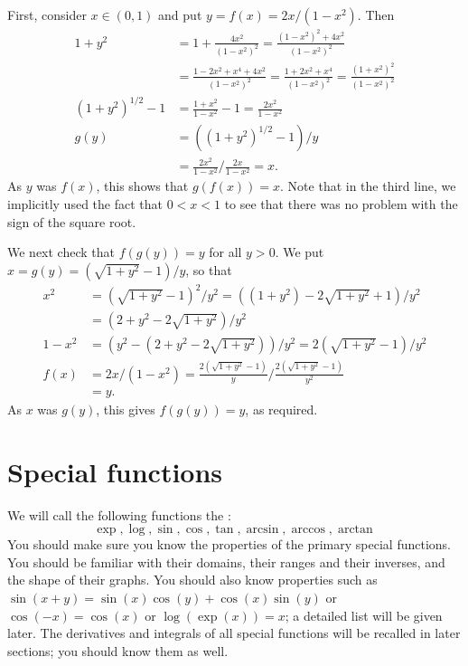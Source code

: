 \documentclass[a4paper]{book}
\theoremstyle{definition}
\renewenvironment{solution}{\SolutionInline}{\endSolutionInline}
\begin{document}
\begin{solution}
 First, consider $x\in(0,1)$ and put $y=f(x)=2x/(1-x^2)$.  Then 
 \begin{align*}
  1+y^2 &= 1 + \frac{4x^2}{(1-x^2)^2} = 
           \frac{(1-x^2)^2+4x^2}{(1-x^2)^2}  \\
        &= \frac{1-2x^2+x^4+4x^2}{(1-x^2)^2} =
           \frac{1+2x^2+x^4}{(1-x^2)^2} =
           \frac{(1+x^2)^2}{(1-x^2)^2} \\
  (1+y^2)^{1/2} - 1 &= \frac{1+x^2}{1-x^2} - 1 =
                       \frac{2x^2}{1-x^2} \\
  g(y) &= ((1+y^2)^{1/2}-1)/y \\
       &= \frac{2x^2}{1-x^2} / \frac{2x}{1-x^2} = x.
 \end{align*}
 As $y$ was $f(x)$, this shows that $g(f(x))=x$.  Note that in the
 third line, we implicitly used the fact that $0<x<1$ to see that
 there was no problem with the sign of the square root.

 We next check that $f(g(y))=y$ for all $y>0$.  We put
 $x=g(y)=(\sqrt{1+y^2}-1)/y$, so that
 \begin{align*}
  x^2 &= (\sqrt{1+y^2}-1)^2/y^2 = ((1+y^2) - 2 \sqrt{1+y^2} + 1)/y^2 \\
      &= (2+y^2-2\sqrt{1+y^2})/y^2 \\
  1-x^2 &= (y^2 - (2+y^2-2\sqrt{1+y^2}))/y^2 = 2(\sqrt{1+y^2}-1)/y^2 \\
  f(x) &= 2x/(1-x^2) = \frac{2(\sqrt{1+y^2}-1)}{y}/
                       \frac{2(\sqrt{1+y^2}-1)}{y^2} \\
       &= y.
 \end{align*}
 As $x$ was $g(y)$, this gives $f(g(y))=y$, as required.
\end{solution}

\chapter{Special functions}\label{chap-special}

We will call the following functions the :
\[ \exp, \log, \sin, \cos, \tan, \arcsin, \arccos, \arctan \]
You should make sure you know the properties of the primary special
functions.  You should be familiar with their domains, their ranges
and their inverses, and the shape of their graphs.  You should also
know properties such as $\sin(x+y)=\sin(x)\cos(y)+\cos(x)\sin(y)$ or
$\cos(-x)=\cos(x)$ or $\log(\exp(x))=x$; a detailed list will be given
later.  The derivatives and integrals of all special functions will be
recalled in later sections; you should know them as well.
\end{document}
